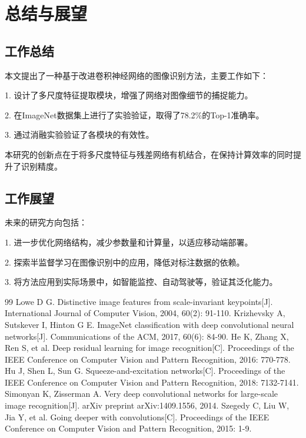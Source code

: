 \documentclass[a4paper,12pt]{article}
\begin{document}
\section{总结与展望}

\subsection{工作总结}

本文提出了一种基于改进卷积神经网络的图像识别方法，主要工作如下：

1. 设计了多尺度特征提取模块，增强了网络对图像细节的捕捉能力。

2. 在ImageNet数据集上进行了实验验证，取得了78.2\%的Top-1准确率。

 3. 通过消融实验验证了各模块的有效性。

本研究的创新点在于将多尺度特征与残差网络有机结合，在保持计算效率的同时提升了识别精度。

\subsection{工作展望}

未来的研究方向包括：

 1. 进一步优化网络结构，减少参数量和计算量，以适应移动端部署。

 2. 探索半监督学习在图像识别中的应用，降低对标注数据的依赖。

 3. 将方法应用到实际场景中，如智能监控、自动驾驶等，验证其泛化能力。

\newpage
\begin{thebibliography}{99}
\fontsize{10.5pt}{15.75pt}\selectfont
{} Lowe D G. Distinctive image features from scale-invariant keypoints[J]. International Journal of Computer Vision, 2004, 60(2): 91-110.
 Krizhevsky A, Sutskever I, Hinton G E. ImageNet classification with deep convolutional neural networks[J]. Communications of the ACM, 2017, 60(6): 84-90.
 He K, Zhang X, Ren S, et al. Deep residual learning for image recognition[C]. Proceedings of the IEEE Conference on Computer Vision and Pattern Recognition, 2016: 770-778.
 Hu J, Shen L, Sun G. Squeeze-and-excitation networks[C]. Proceedings of the IEEE Conference on Computer Vision and Pattern Recognition, 2018: 7132-7141.
 Simonyan K, Zisserman A. Very deep convolutional networks for large-scale image recognition[J]. arXiv preprint arXiv:1409.1556, 2014.
 Szegedy C, Liu W, Jia Y, et al. Going deeper with convolutions[C]. Proceedings of the IEEE Conference on Computer Vision and Pattern Recognition, 2015: 1-9.
\end{thebibliography}
\end{document}
